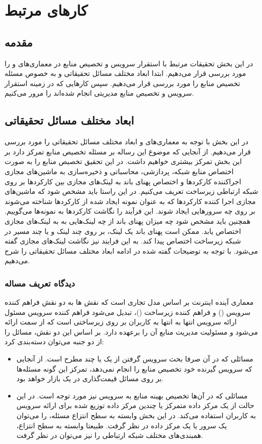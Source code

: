 
\chapter{کارهای مرتبط}

\section{مقدمه}
در این بخش تحقیقات مرتبط با استقرار سرویس و تخصیص منابع در معماری‌های   و  را مورد بررسی قرار می‌دهیم.
ابتدا ابعاد مختلف مسائل تحقیقاتی و به خصوص مسئله تخصیص منابع را مورد بررسی قرار می‌دهیم.
سپس کارهایی که در زمینه استقرار سرویس و تخصیص منابع مدیریتی انجام شده‌اند را مرور می‌کنیم.

\section{ابعاد مختلف مسائل تحقیقاتی}
در این بخش با توجه به معماری‌های  و  ابعاد مختلف مسائل تحقیقاتی را مورد بررسی قرار می‌دهیم.
از آنجایی که موضوع این رساله بر مسئله تخصیص منابع تمرکز دارد بر این بخش تمرکز بیشتری خواهیم داشت.
در این تحقیق تخصیص منابع را به صورت اختصاص منابع شبکه، پردازشی، محاسباتی و ذخیره‌سازی
به ماشین‌‌های مجازی اجراکننده کارکردها و اختصاص پهنای باند به لینک‌های مجازی بین کارکردها بر روی شبکه ارتباطی زیرساخت تعریف می‌کنیم.
در این راستا باید مشخص شود که ماشین‌های مجازی اجرا کننده کارکردها که به عنوان نمونه ایجاد شده از کارکردها شناخته می‌شوند
بر روی چه سرورهایی ایجاد شوند.
این فرآیند را نگاشت کارکردها به نمونه‌ها می‌گوییم.
همچنین باید مشخص شود چه میزان پهنای باند از چه لینک‌هایی به به لینک‌های مجازی اختصاص یابد.
ممکن است پهنای باند یک لینک، بر روی چند لینک و یا چند مسیر در شبکه زیرساخت اختصاص پیدا کند.
به این فرایند نیز نگاشت لینک‌های مجازی گفته می‌شود.
با توجه به توضیحات گفته شده در ادامه ابعاد مختلف مسائل تحقیقاتی را شرح می‌دهیم.

\subsection{دیدگاه تعریف مساله}
معماری آینده اینترنت بر اساس مدل تجاری  است که
نقش ‌ها به دو نقش فراهم کننده سرویس () و فراهم کننده زیرساخت ()، تبدیل می‌شود
فراهم کننده سرویس مسئول ارائه سرویس انتها به انتها به کاربران بر روی زیرساختی است که
از سمت  ارائه می‌شود و مسئولیت مدیریت منابع آن را برعهده دارد.
بر اساس این دو نقش، مسائل را از دو جنبه می‌توان دسته‌بندی کرد:

\begin{itemize}
    \item مسائلی که در آن صرفا بحث سرویس گرفتن از یک یا چند  مطرح است. از آنجایی که سرویس گیرنده خود تخصیص منابع را انجام نمی‌دهد، تمرکز این گونه مسئله‌ها بر روی مسائل قیمت‌گذاری در یک بازار  خواهد بود.
    \item مسائلی که در آن‌ها تخصیص بهینه منابع به سرویس نیز مورد توجه است. در این حالت  از یک مرکز داده متمرکز یا چندین مرکز داده توزیع شده برای ارائه سرویس به کاربران استفاده می‌کند. در این بخش وابسته به سطح انتزاع مسئله،  را می‌توان یک سرور یا یک مرکز داده در نظر گرفت. طبیعتا وابسته به سطح انتزاع، همبندی‌‌های مختلف شبکه ارتباطی را نیز می‌توان در نظر گرفت.
\end{itemize}

